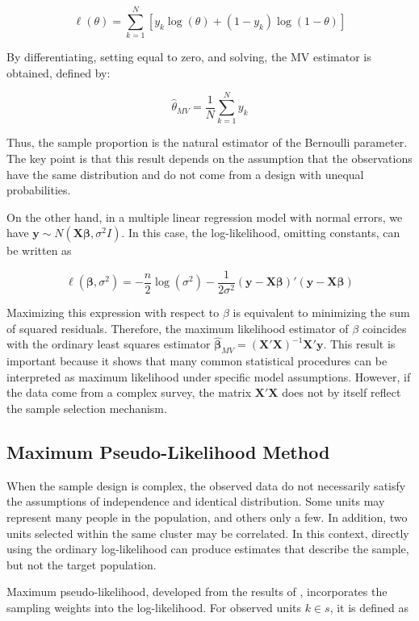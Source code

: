 \documentclass[
  english,
  12pt,
]{book}
\begin{document}
\[
\ell(\theta)
= \sum_{k=1}^{N}
\left[
y_k\log(\theta)
+(1-y_k)\log(1-\theta)
\right]
\]

By differentiating, setting equal to zero, and solving, the MV estimator is obtained, defined by:

\[
\hat{\theta}_{MV}
= \frac{1}{N}\sum_{k=1}^{N}y_k
\]

Thus, the sample proportion is the natural estimator of the Bernoulli parameter. The key point is that this result depends on the assumption that the observations have the same distribution and do not come from a design with unequal probabilities.

On the other hand, in a multiple linear regression model with normal errors, we have \(\mathbf{y} \sim N(\mathbf{X}\boldsymbol{\beta},\sigma^2 I)\). In this case, the log-likelihood, omitting constants, can be written as

\[
\ell(\boldsymbol{\beta},\sigma^2) = -\frac{n}{2}\log(\sigma^2) -\frac{1}{2\sigma^2}(\mathbf{y}-\mathbf{X}\boldsymbol{\beta})'(\mathbf{y}-\mathbf{X}\boldsymbol{\beta})
\]

Maximizing this expression with respect to \(\beta\) is equivalent to minimizing the sum of squared residuals. Therefore, the maximum likelihood estimator of \(\beta\) coincides with the ordinary least squares estimator \(\hat{\boldsymbol{\beta}}_{MV} = (\mathbf{X}'\mathbf{X})^{-1}\mathbf{X}'\mathbf{y}\). This result is important because it shows that many common statistical procedures can be interpreted as maximum likelihood under specific model assumptions. However, if the data come from a complex survey, the matrix \(\mathbf{X}'\mathbf{X}\) does not by itself reflect the sample selection mechanism.

\subsection{Maximum Pseudo-Likelihood Method}\label{sec-mpv-formal}

When the sample design is complex, the observed data do not necessarily satisfy the assumptions of independence and identical distribution. Some units may represent many people in the population, and others only a few. In addition, two units selected within the same cluster may be correlated. In this context, directly using the ordinary log-likelihood can produce estimates that describe the sample, but not the target population.

Maximum pseudo-likelihood, developed from the results of \citet{binder1983variances}, incorporates the sampling weights into the log-likelihood. For observed units \(k \in s\), it is defined as
\end{document}
